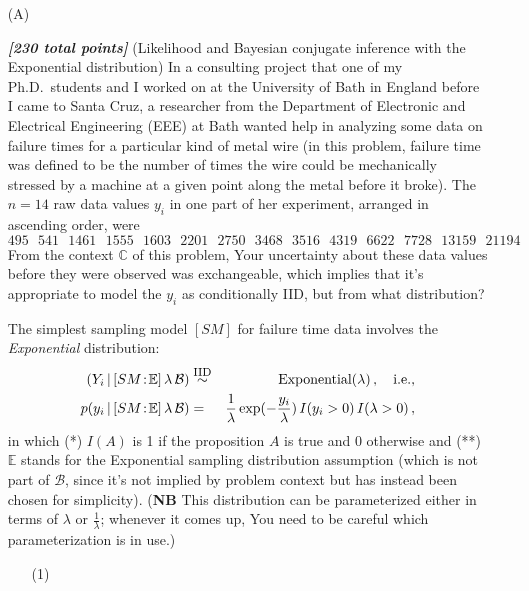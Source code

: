 \documentclass[12pt]{article}
\newcommand{\given}{\, | \,}
\newcommand{\bi}[1]{\b{\i{#1}}}
\renewcommand{\b}[1]{\textbf{#1}}
\renewcommand{\i}[1]{\textit{#1}}
\renewcommand{\r}[1]{\text{#1}}
\begin{document}
\begin{itemize}

\item[(A)]

\bi{[230 total points]} (Likelihood and Bayesian conjugate inference with the Exponential distribution) In a consulting project that one of my Ph.D.~students and I worked on at the University of Bath in England before I came to Santa Cruz, a researcher from the Department of Electronic and Electrical Engineering (EEE) at Bath wanted help in analyzing some data on failure times for a particular kind of metal wire (in this problem, failure time was defined to be the number of times the wire could be mechanically stressed by a machine at a given point along the metal before it broke). The $n = 14$ raw data values $y_i$ in one part of her experiment, arranged in ascending order, were 
\[ 
495 \ \ \ 541 \ \ \ 1461 \ \ \ 1555 \ \ \ 1603 \ \ \ 2201 \ \ \ 2750 \ \ \
3468 \ \ \ 3516 \ \ \ 4319 \ \ \ 6622 \ \ \ 7728 \ \ \ 13159 \ \ \ 21194 
\] 
From the context $\mathbb{ C }$ of this problem, Your uncertainty about these data values before they were observed was exchangeable, which implies that it's appropriate to model the $y_i$ as conditionally IID, but from what distribution?

The simplest sampling model $[ SM ]$ for failure time data involves the \textit{Exponential} distribution: 
\begin{eqnarray} \label{e:exponential-model-1}
( Y_i \given [ SM \! : \! \mathbb{ E } ] \, \lambda \, \mathcal{ B } ) & \stackrel{ \mbox{\footnotesize IID} }{ \sim } & \textrm{Exponential} ( \lambda ) \, , \ \ \ \r{i.e.,} \nonumber \\ p( y_i \given [ SM \! : \! \mathbb{ E } ] \, \lambda \,  \mathcal{ B } ) & = & \frac{ 1 }{ \lambda } \exp( - \frac{ y_i }{ \lambda } ) \, I ( y_i > 0 ) \, I ( \lambda > 0 ) \, ,
\end{eqnarray}
in which (*) $I ( A )$ is 1 if the proposition $A$ is true and 0 otherwise and (**) $\mathbb{ E }$ stands for the Exponential sampling distribution assumption (which is not part of $\mathcal{ B }$, since it's not implied by problem context but has instead been chosen for simplicity). (\textbf{NB} This distribution can be parameterized either in terms of $\lambda$ or $\frac{ 1 }{ \lambda }$; whenever it comes up, You need to be careful which parameterization is in use.)

\begin{itemize}

\item[(1)]


\end{itemize}
\end{itemize}
\end{document}
